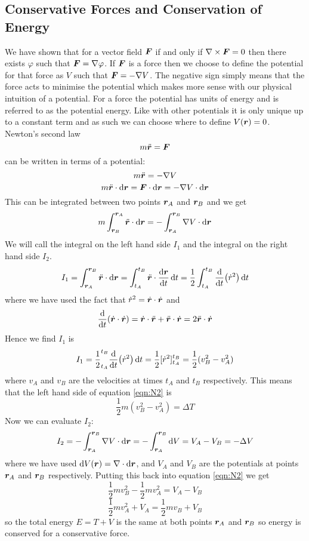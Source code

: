 \documentclass{article}
\begin{document}
    \subsection{Conservative Forces and Conservation of Energy}
    We have shown that for a vector field \(\bm{F}\) if and only if \(\nabla\times\bm{F} = 0\) then there exists \(\varphi\) such that \(\bm{F} = \nabla\varphi\).
    If \(\bm{F}\) is a force then we choose to define the potential for that force as \(V\) such that \(\bm{F} = -\nabla V\).
    The negative sign simply means that the force acts to minimise the potential which makes more sense with our physical intuition of a potential.
    For a force the potential has units of energy and is referred to as the potential energy.
    Like with other potentials it is only unique up to a constant term and as such we can choose where to define \(V(\bm{r}) = 0\).
    Newton's second law
    \[m\ddot{\bm{r}} = \bm{F}\]
    can be written in terms of a potential:
    \[m\ddot{\bm{r}} = -\nabla V\]
    \[m\ddot{\bm{r}}\cdot\dd\bm{r} = \bm{F}\cdot\dd\bm{r} = -\nabla V\cdot\dd\bm{r}\]
    This can be integrated between two points \(\bm{r}_A\) and \(\bm{r}_B\) and we get
    \begin{equation}\label{eqn:N2}
        m\int_{\bm{r}_B}^{\bm{r}_A} \ddot{\bm{r}}\cdot\dd\bm{r} = -\int_{\bm{r}_A}^{\bm{r}_B}\nabla V\cdot\dd\bm{r}
    \end{equation}
    We will call the integral on the left hand side \(I_1\) and the integral on the right hand side \(I_2\).
    \[I_1 = \int_{\bm{r}_A}^{\bm{r}_B}\ddot{\bm{r}}\cdot\dd\bm{r} = \int_{t_A}^{t_B}\ddot{\bm{r}}\cdot\dv{\bm{r}}{t}\,\dd t = \frac{1}{2}\int_{t_A}^{t_B}\dv{t}(\dot r^2)\,\dd t\]
    where we have used the fact that \(\dot r^2 = \dot{\bm{r}}\cdot\dot{\bm{r}}\) and
    \[\dv{t}(\dot{\bm{r}}\cdot\dot{\bm{r}}) = \dot{\bm{r}}\cdot\ddot{\bm{r}} + \ddot{\bm{r}}\cdot\dot{\bm{r}} = 2\ddot{\bm{r}}\cdot\dot{\bm{r}}\]
    Hence we find \(I_1\) is
    \[I_1 = \frac{1}{2}_{t_A}^{t_B}\dv{t}(\dot r^2)\,\dd t = \frac{1}{2}[\dot r^2]_{t_A}^{t_B} = \frac{1}{2}(v_B^2 - v_A^2)\]
    where \(v_A\) and \(v_B\) are the velocities at times \(t_A\) and \(t_B\) respectively.
    This means that the left hand side of equation \ref{eqn:N2} is
    \[\frac{1}{2}m(v_B^2 - v_A^2) = \Delta T\]
    Now we can evaluate \(I_2\):
    \[I_2 = -\int_{\bm{r}_A}^{\bm{r}_B} \nabla V\cdot\dd\bm{r} = -\int_{\bm{r}_A}^{\bm{r}_B}\dd V = V_A - V_B = -\Delta V\]
    where we have used \(\dd V(\bm{r}) = \nabla\cdot\dd\bm{r}\), and \(V_A\) and \(V_B\) are the potentials at points \(\bm{r}_A\) and \(\bm{r}_B\) respectively.
    Putting this back into equation \ref{eqn:N2} we get
    \[\frac{1}{2}mv_B^2 - \frac{1}{2}mv_A^2 = V_A - V_B\]
    \[\frac{1}{2}mv_A^2 + V_A = \frac{1}{2}mv_B + V_B\]
    so the total energy \(E = T + V\) is the same at both points \(\bm{r}_A\) and \(\bm{r}_B\) so energy is conserved for a conservative force.
    
\end{document}

